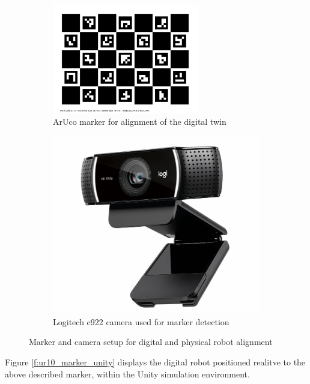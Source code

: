 \begin{figure}[h]
    \centering
    \begin{subfigure}[b]{0.45\textwidth}
    \centering
    \includegraphics[width=0.7\textwidth]{figs/calib_io_charuco_200x150_5x7_25_18_DICT_4X4.png}
    \caption{ArUco marker for alignment of the digital twin}
    \label{f:aruco_marker}
    \end{subfigure}
        \hfill
    \begin{subfigure}[b]{0.45\textwidth}
        \centering
        \includegraphics[width=0.7\linewidth]{figs/camera-c922.jpg}
        \caption{Logitech c922 camera used for marker detection}
        \label{fig:camera-c922}
    \end{subfigure}
    \caption{Marker and camera setup for digital and physical robot alignment}
\label{marker-camera}
\end{figure}

Figure \ref{f:ur10_marker_unity} displays the digital robot positioned realitve to the above described marker, within the Unity simulation environment.


